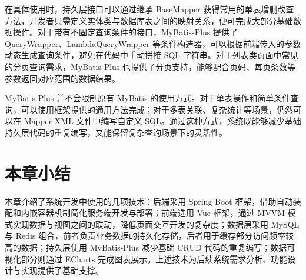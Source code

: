 在具体使用时，持久层接口可以通过继承 BaseMapper 获得常用的单表增删改查方法，开发者只需定义实体类与数据库表之间的映射关系，便可完成大部分基础数据操作。对于带有不固定查询条件的接口，MyBatis-Plus 提供了 QueryWrapper、LambdaQueryWrapper 等条件构造器，可以根据前端传入的参数动态生成查询条件，避免在代码中手动拼接 SQL 字符串。对于列表类页面中常见的分页查询需求，MyBatis-Plus 也提供了分页支持，能够配合页码、每页条数等参数返回对应范围的数据结果。

MyBatis-Plus 并不会限制原有 MyBatis 的使用方式。对于单表操作和简单条件查询，可以使用框架提供的通用方法完成；对于多表关联、复杂统计等场景，仍然可以在 Mapper XML 文件中编写自定义 SQL。通过这种方式，系统既能够减少基础持久层代码的重复编写，又能保留复杂查询场景下的灵活性。

\section{本章小结}

本章介绍了系统开发中使用的几项技术：后端采用 Spring Boot 框架，借助自动装配和内嵌容器机制简化服务端开发与部署；前端选用 Vue 框架，通过 MVVM 模式实现数据与视图之间的联动，降低页面交互开发的复杂度；数据层采用 MySQL 与 Redis 组合，前者负责业务数据的持久化存储，后者用于缓存部分访问频率较高的数据；持久层使用 MyBatis-Plus 减少基础 CRUD 代码的重复编写；数据可视化部分则通过 ECharts 完成图表展示。上述技术为后续系统需求分析、功能设计与实现提供了基础支撑。
